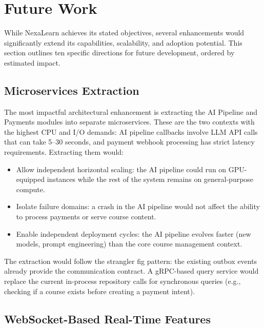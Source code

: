 
\section{Future Work}
\label{sec:future-work}

While NexaLearn achieves its stated objectives, several enhancements would significantly extend its capabilities, scalability, and adoption potential. This section outlines ten specific directions for future development, ordered by estimated impact.

\subsection{Microservices Extraction}

The most impactful architectural enhancement is extracting the AI Pipeline and Payments modules into separate microservices. These are the two contexts with the highest CPU and I/O demands: AI pipeline callbacks involve LLM API calls that can take 5--30 seconds, and payment webhook processing has strict latency requirements. Extracting them would:

\begin{itemize}
  \item Allow independent horizontal scaling: the AI pipeline could run on GPU-equipped instances while the rest of the system remains on general-purpose compute.
  \item Isolate failure domains: a crash in the AI pipeline would not affect the ability to process payments or serve course content.
  \item Enable independent deployment cycles: the AI pipeline evolves faster (new models, prompt engineering) than the core course management context.
\end{itemize}

The extraction would follow the strangler fig pattern: the existing outbox events already provide the communication contract. A gRPC-based query service would replace the current in-process repository calls for synchronous queries (e.g., checking if a course exists before creating a payment intent).

\subsection{WebSocket-Based Real-Time Features}

